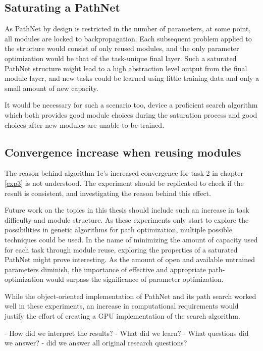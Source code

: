 \subsection{Saturating a PathNet}
As PathNet by design is restricted in the number of parameters, at some point, all modules are locked to backpropagation. Each subsequent problem applied to the structure would consist of only reused modules, and the only parameter optimization would be that of the task-unique final layer. Such a saturated PathNet structure might lead to a high abstraction level output from the final module layer, and new tasks could be learned using little training data and only a small amount of new capacity. 

It would be necessary for such a scenario too, device a proficient search algorithm which both provides good module choices during the saturation process and good choices after new modules are unable to be trained. 

\subsection{Convergence increase when reusing modules}
The reason behind algorithm 1c's increased convergence for task 2 in chapter \ref{exp3} is not understood. The experiment should be replicated to check if the result is consistent, and investigating the reason behind this effect. 



\iffalse
Future work on the topics in this thesis should include such an increase in task difficulty and module structure. As these experiments only start to explore the possibilities in genetic algorithms for path optimization, multiple possible techniques could be used. In the name of minimizing the amount of capacity used for each task through module reuse, exploring the properties of a saturated PathNet might prove interesting. As the amount of open and available untrained parameters diminish, the importance of effective and appropriate path-optimization would surpass the significance of parameter optimization. 

While the object-oriented implementation of PathNet and its path search worked well in these experiments, an increase in computational requirements would justify the effort of creating a GPU implementation of the search algorithm. 



- How did we interpret the results?
- What did we learn?
- What questions did we answer?
- did we answer all original research questions?

